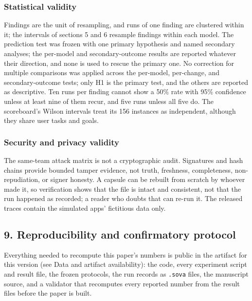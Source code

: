 \documentclass[
  american,
  10pt,
  a4paper,
]{article}
\newcounter{none} %
\begin{document}
\subsubsection{Statistical validity}\label{statistical-validity}

Findings are the unit of resampling, and runs of one finding are
clustered within it; the intervals of sections 5 and 6 resample findings
within each model. The prediction test was frozen with one primary
hypothesis and named secondary analyses; the per-model and
secondary-outcome results are reported whatever their direction, and
none is used to rescue the primary one. No correction for multiple
comparisons was applied across the per-model, per-change, and
secondary-outcome tests; only H1 is the primary test, and the others are
reported as descriptive. Ten runs per finding cannot show a 50\% rate
with 95\% confidence unless at least nine of them recur, and five runs
unless all five do. The scoreboard's Wilson intervals treat its 156
instances as independent, although they share user tasks and goals.

\subsubsection{Security and privacy
validity}\label{security-and-privacy-validity}

The same-team attack matrix is not a cryptographic audit. Signatures and
hash chains provide bounded tamper evidence, not truth, freshness,
completeness, non-repudiation, or signer honesty. A capsule can be
rebuilt from scratch by whoever made it, so verification shows that the
file is intact and consistent, not that the run happened as recorded; a
reader who doubts that can re-run it. The released traces contain the
simulated apps' fictitious data only.

\subsection{9. Reproducibility and confirmatory
protocol}\label{reproducibility-and-confirmatory-protocol}

Everything needed to recompute this paper's numbers is public in the
artifact for this version (see Data and artifact availability): the
code, every experiment script and result file, the frozen protocols, the
run records as \texttt{.sova} files, the manuscript source, and a
validator that recomputes every reported number from the result files
before the paper is built.
\end{document}
